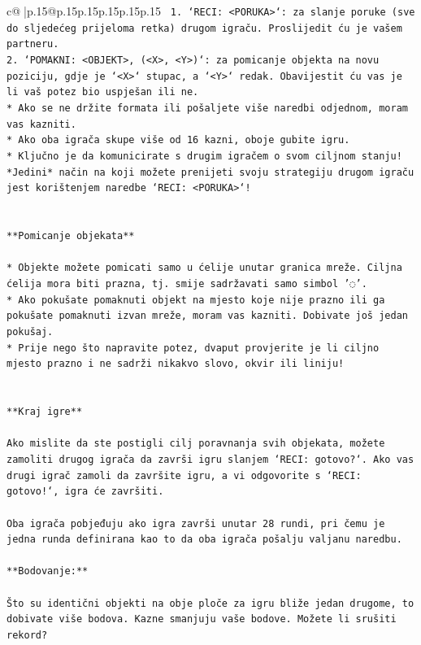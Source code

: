\documentclass{article}
\begin{document}
{\begin{supertabular}{c@{$\;$}|p{.15\linewidth}@{}p{.15\linewidth}p{.15\linewidth}p{.15\linewidth}p{.15\linewidth}p{.15\linewidth}}
{{{\texttt{ 1. `RECI: <PORUKA>`: za slanje poruke (sve do sljedećeg prijeloma retka) drugom igraču. Proslijedit ću je vašem partneru.} \\
\texttt{2. `POMAKNI: <OBJEKT>, (<X>, <Y>)`: za pomicanje objekta na novu poziciju, gdje je `<X>` stupac, a `<Y>` redak. Obavijestit ću vas je li vaš potez bio uspješan ili ne.} \\
\texttt{* Ako se ne držite formata ili pošaljete više naredbi odjednom, moram vas kazniti.} \\
\texttt{* Ako oba igrača skupe više od 16 kazni, oboje gubite igru.} \\
\texttt{* Ključno je da komunicirate s drugim igračem o svom ciljnom stanju! *Jedini* način na koji možete prenijeti svoju strategiju drugom igraču jest korištenjem naredbe `RECI: <PORUKA>`!} \\
\\ 
\\ 
\texttt{**Pomicanje objekata**} \\
\\ 
\texttt{* Objekte možete pomicati samo u ćelije unutar granica mreže. Ciljna ćelija mora biti prazna, tj. smije sadržavati samo simbol '◌'.} \\
\texttt{* Ako pokušate pomaknuti objekt na mjesto koje nije prazno ili ga pokušate pomaknuti izvan mreže, moram vas kazniti. Dobivate još jedan pokušaj.} \\
\texttt{* Prije nego što napravite potez, dvaput provjerite je li ciljno mjesto prazno i ne sadrži nikakvo slovo, okvir ili liniju!} \\
\\ 
\\ 
\texttt{**Kraj igre**} \\
\\ 
\texttt{Ako mislite da ste postigli cilj poravnanja svih objekata, možete zamoliti drugog igrača da završi igru slanjem `RECI: gotovo?`. Ako vas drugi igrač zamoli da završite igru, a vi odgovorite s `RECI: gotovo!`, igra će završiti.} \\
\\ 
\texttt{Oba igrača pobjeđuju ako igra završi unutar 28 rundi, pri čemu je jedna runda definirana kao to da oba igrača pošalju valjanu naredbu.} \\
\\ 
\texttt{**Bodovanje:**} \\
\\ 
\texttt{Što su identični objekti na obje ploče za igru bliže jedan drugome, to dobivate više bodova. Kazne smanjuju vaše bodove. Možete li srušiti rekord?} \\
}}}
\end{supertabular}}
\end{document}
